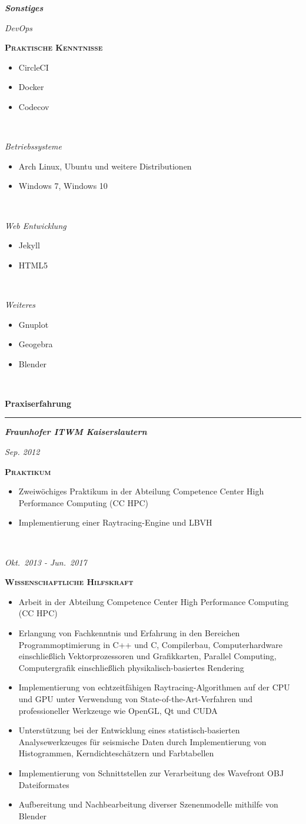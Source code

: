 \documentclass[8pt]{article}
\newcommand{\cvSectionStyle}{%
  \normalfont%
  \Large%
  \color{cvColor}%
  \bfseries%
  \sffamily%
}
\newcommand{\cvSubsectionStyle}{%
  \normalfont%
  \sffamily%
  \itshape%
  \bfseries%
}
\newcommand{\cvSection}[1]{%
  \smallskip%
  {%
    \cvSectionStyle #1%
  }\\[-0.5em]
  \rule{\linewidth}{0.8pt}%
  \par%
  \smallskip%
}
\newcommand{\cvSubsection}[1]{%
  \begin{tcolorbox}[left=0pt, top=0pt, bottom=0pt, right=0pt, boxsep=5pt, arc=5pt, frame code={}, colback=cvBackgroundColor]
    \cvSubsectionStyle #1%
  \end{tcolorbox}
}
\newenvironment{cvEducationItem}[2]{
  \par
  \begin{minipage}[c]{0.15\linewidth}
    \raggedleft
    \footnotesize
    \textit{#1}
  \end{minipage}
  \quad
  \vrule
  \quad
  \begin{minipage}[t]{0.7\linewidth}
    \textsc{\color{cvColor} \textbf{#2}}
    \footnotesize
    \begin{itemize}[itemsep=0mm, leftmargin=3mm]
}{
    \end{itemize}
  \end{minipage}
  \\[0.5em]
}
\begin{document}
  \cvSubsection{Sonstiges}
  \vspace{-1.8em}
  \begin{multicols}{2}
  \begin{cvEducationItem}{DevOps}{Praktische Kenntnisse}
    \item CircleCI
    \item Docker
    \item Codecov
  \end{cvEducationItem}
  \begin{cvEducationItem}{Betriebssysteme}{}
    \item Arch Linux, Ubuntu und weitere Distributionen
    \item Windows 7, Windows 10
  \end{cvEducationItem}
  \begin{cvEducationItem}{Web Entwicklung}{}
    \item Jekyll
    \item HTML5
  \end{cvEducationItem}
  \begin{cvEducationItem}{Weiteres}{}
    \item Gnuplot
    \item Geogebra
    \item Blender
  \end{cvEducationItem}
  \end{multicols}


  \cvSection{Praxiserfahrung}
  \cvSubsection{Fraunhofer ITWM Kaiserslautern}
  \begin{cvEducationItem}{Sep. 2012}{Praktikum}
    \item Zweiwöchiges Praktikum in der Abteilung Competence Center High Performance Computing (CC HPC)
    \item Implementierung einer Raytracing-Engine und LBVH
  \end{cvEducationItem}
  \begin{cvEducationItem}{Okt.~2013 - Jun.~2017}{Wissenschaftliche Hilfskraft}
    \item Arbeit in der Abteilung Competence Center High Performance Computing (CC HPC)
    \item Erlangung von Fachkenntnis und Erfahrung in den Bereichen Programmoptimierung in C++ und C, Compilerbau, Computerhardware einschließlich Vektorprozessoren und Grafikkarten, Parallel Computing, Computergrafik einschließlich physikalisch-basiertes Rendering
    \item Implementierung von echtzeitfähigen Raytracing-Algorithmen auf der CPU und GPU unter Verwendung von State-of-the-Art-Verfahren und professioneller Werkzeuge wie OpenGL, Qt und CUDA
    \item Unterstützung bei der Entwicklung eines statistisch-basierten Analysewerkzeuges für seismische Daten durch Implementierung von Histogrammen, Kerndichteschätzern und Farbtabellen
    \item Implementierung von Schnittstellen zur Verarbeitung des Wavefront OBJ Dateiformates
    \item Aufbereitung und Nachbearbeitung diverser Szenenmodelle mithilfe von Blender
  \end{cvEducationItem}
\end{document}
